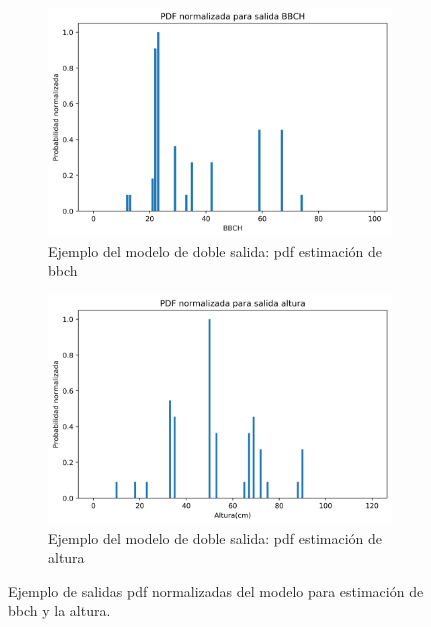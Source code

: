 \begin{figure}[H]
\centering
\begin{subfigure}{0.6\textwidth}
  \centering
  \includegraphics[width=0.95\linewidth]{archivos/tfg/Pixel/BBCHH_PDF_BBCH}
  \caption{Ejemplo del modelo de doble salida: \gls{pdf} estimación de \gls{bbch}\label{fig:p_sub1}}
\end{subfigure}
\begin{subfigure}{0.6\textwidth}
  \centering
  \includegraphics[width=0.95\linewidth]{archivos/tfg/Pixel/BBCHH_PDF_H}
  \caption{Ejemplo del modelo de doble salida: \gls{pdf} estimación de altura\label{fig:p_sub2}}
\end{subfigure}
\caption{Ejemplo de salidas \gls{pdf} normalizadas del modelo para estimación de \gls{bbch} y la altura. \label{fig:p_pdf_bh}}
\end{figure}

